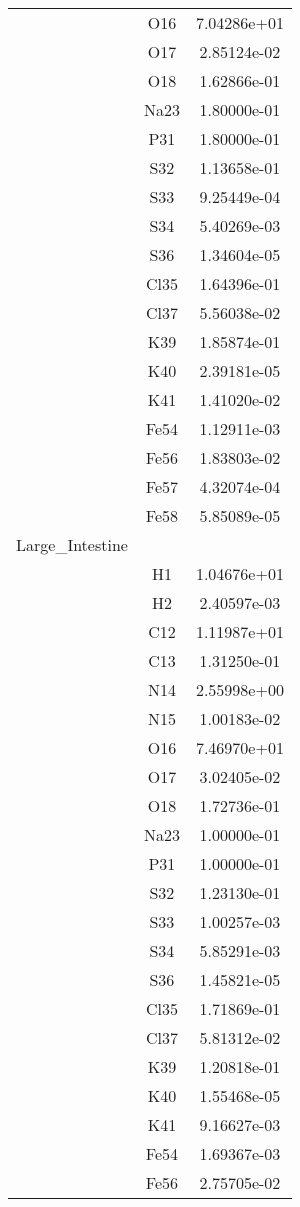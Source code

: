 \begin{centering}
\begin{longtable}{l c c}
& O16 & 7.04286e+01 \\ 
& O17 & 2.85124e-02 \\ 
& O18 & 1.62866e-01 \\ 
& Na23 & 1.80000e-01 \\ 
& P31 & 1.80000e-01 \\ 
& S32 & 1.13658e-01 \\ 
& S33 & 9.25449e-04 \\ 
& S34 & 5.40269e-03 \\ 
& S36 & 1.34604e-05 \\ 
& Cl35 & 1.64396e-01 \\ 
& Cl37 & 5.56038e-02 \\ 
& K39 & 1.85874e-01 \\ 
& K40 & 2.39181e-05 \\ 
& K41 & 1.41020e-02 \\ 
& Fe54 & 1.12911e-03 \\ 
& Fe56 & 1.83803e-02 \\ 
& Fe57 & 4.32074e-04 \\ 
& Fe58 & 5.85089e-05 \\ 
\hline
Large_Intestine & & \\
\hline
& H1 & 1.04676e+01 \\ 
& H2 & 2.40597e-03 \\ 
& C12 & 1.11987e+01 \\ 
& C13 & 1.31250e-01 \\ 
& N14 & 2.55998e+00 \\ 
& N15 & 1.00183e-02 \\ 
& O16 & 7.46970e+01 \\ 
& O17 & 3.02405e-02 \\ 
& O18 & 1.72736e-01 \\ 
& Na23 & 1.00000e-01 \\ 
& P31 & 1.00000e-01 \\ 
& S32 & 1.23130e-01 \\ 
& S33 & 1.00257e-03 \\ 
& S34 & 5.85291e-03 \\ 
& S36 & 1.45821e-05 \\ 
& Cl35 & 1.71869e-01 \\ 
& Cl37 & 5.81312e-02 \\ 
& K39 & 1.20818e-01 \\ 
& K40 & 1.55468e-05 \\ 
& K41 & 9.16627e-03 \\ 
& Fe54 & 1.69367e-03 \\ 
& Fe56 & 2.75705e-02 \\ 

\end{longtable}
\end{centering}
